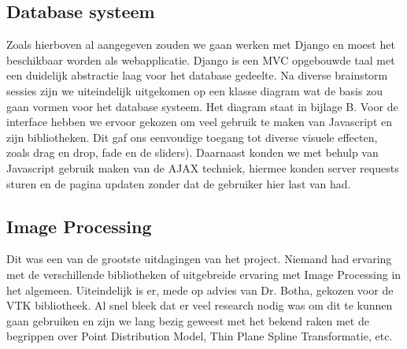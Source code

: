 \subsection{Database systeem}
Zoals hierboven al aangegeven zouden we gaan werken met Django en moest het beschikbaar worden als webapplicatie. Django is een MVC opgebouwde taal met een duidelijk abstractie laag voor het database gedeelte. Na diverse brainstorm sessies zijn we uiteindelijk uitgekomen op een klasse diagram wat de basis zou gaan vormen voor het database systeem. Het diagram staat in bijlage B.
Voor de interface hebben we ervoor gekozen om veel gebruik te maken van Javascript en zijn bibliotheken. Dit gaf ons eenvoudige toegang tot diverse visuele effecten, zoals drag en drop, fade en de sliders). Daarnaast konden we met behulp van Javascript gebruik maken van de AJAX techniek, hiermee konden server requests sturen en de pagina updaten zonder dat de gebruiker hier last van had. 
\subsection{Image Processing}
Dit was een van de grootste uitdagingen van het project. Niemand had ervaring met de verschillende bibliotheken of uitgebreide ervaring met Image Processing in het algemeen. Uiteindelijk is er, mede op advies van Dr. Botha, gekozen voor de VTK bibliotheek. Al snel bleek dat er veel research nodig was om dit te kunnen gaan gebruiken en zijn we lang bezig geweest met het bekend raken met de begrippen over Point Distribution Model, Thin Plane Spline Transformatie, etc.

